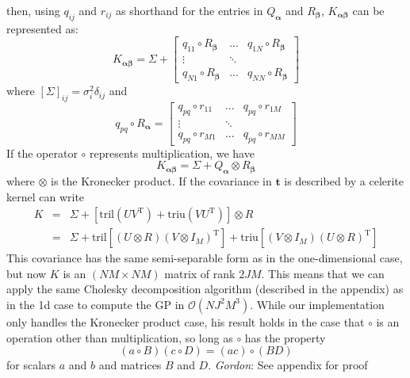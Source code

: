 \documentclass[modern]{aastex62}
\newcommand{\todo}[3]{{\color{#2}\emph{#1}: #3}}
\newcommand{\gordontodo}[1]{\todo{Gordon}{red}{#1}}
\newcommand{\project}[1]{\textsf{#1}}
\newcommand{\celerite}{\project{celerite }}
\newcommand{\bvec}[1]{{\ensuremath{\boldsymbol{#1}}}}
\newcommand{\T}{\ensuremath{\mathrm{T}}}
\begin{document}
	then, using $q_{ij}$ and $r_{ij}$ as shorthand for the entries in $Q_\bvec{\alpha}$ and $R_\bvec{\beta}$, $K_\bvec{\alpha\beta}$ can be represented as: 
	\begin{equation}
		K_\bvec{\alpha\beta} = \Sigma + 
			\begin{bmatrix}
				q_{11}\circ R_\bvec{\beta} & ... & q_{1N}\circ R_\bvec{\beta} \\
				\vdots & \ddots & \\
				q_{N1}\circ R_\bvec{\beta} & ... & q_{NN}\circ R_\bvec{\beta}
			\end{bmatrix}
	\end{equation}
	where $[\Sigma]_{ij} = \sigma_i^2\delta_{ij}$ and
	\begin{equation}
		q_{pq}\circ R_\bvec{\alpha} = 
			\begin{bmatrix}
				q_{pq}\circ r_{11} & ... & q_{pq}\circ r_{1M} \\
				\vdots & \ddots & \\
				q_{pq}\circ r_{M1} & ... & q_{pq}\circ r_{MM}
			\end{bmatrix}
	\end{equation}
	If the operator $\circ$ represents multiplication, we have 
	\begin{equation}
		K_\bvec{\alpha\beta} = \Sigma + Q_\bvec{\alpha} \otimes  R_\bvec{\beta}
	\end{equation}
	where $\otimes$ is the Kronecker product. If the covariance in $\bvec{t}$ is described by a \celerite kernel can write 
	\begin{eqnarray}
		K &=& \Sigma + \left[\mathrm{tril}(UV^\T) + \mathrm{triu}(VU^\T)\right]\otimes R \\
		&=& \Sigma + \mathrm{tril}\left[ (U\otimes R)(V\otimes I_M)^\T\right] + \mathrm{triu}\left[ (V\otimes I_M)(U\otimes R)^\T\right]
	\end{eqnarray}
	This covariance has the same semi-separable form as in the one-dimensional case, but now $K$ is an $(NM\times NM)$ matrix of rank $2JM$. 
	This means that we can apply the same Cholesky decomposition algorithm (described in the appendix) as in the 1d case to compute the GP in 
	$\mathcal{O}(NJ^2M^3)$. While our implementation only handles the Kronecker product case, 
	his result holds in the case that $\circ$ is an operation other than multiplication, so long as $\circ$ has the property
	\begin{equation}
		(a\circ B)(c\circ D) = (ac)\circ(BD)
	\end{equation}
	for scalars $a$ and $b$ and matrices $B$ and $D$. 
	\gordontodo{See appendix for proof}
	
\end{document}
